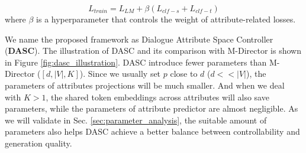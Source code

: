 \begin{equation}
    L_{train} = L_{LM} + \beta (L_{clf-s} + L_{clf-t})
\end{equation}
where $\beta$ is a hyperparameter that controls the weight of attribute-related losses.

We name the proposed framework as Dialogue Attribute Space Controller (\textbf{DASC}). The illustration of DASC and its comparison with M-Director is shown in Figure \ref{fig:dasc_illustration}. DASC introduce fewer parameters than M-Director ($[d, |V|, K]$). Since we usually set $p$ close to $d$ ($d << |V|$), the parameters of attributes projections will be much smaller. And when we deal with $K > 1$, the shared token embeddings across attributes will also save parameters, while the parameters of attribute predictor are almost negligible. As we will validate in Sec. \ref{sec:parameter_analysis}, the suitable amount of parameters also helps DASC achieve a better balance between controllability and generation quality. 


